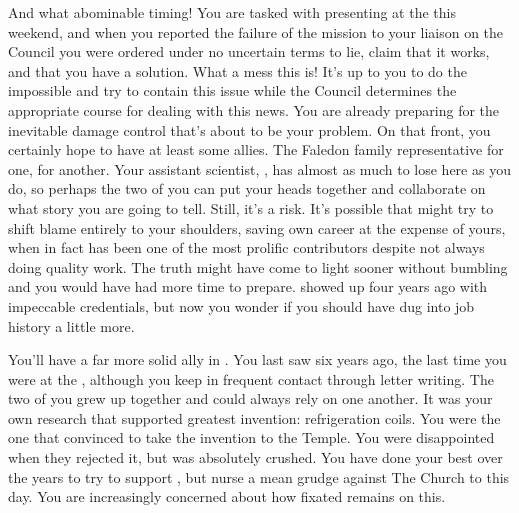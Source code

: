 \documentclass[char]{GL2020}
\begin{document}
And what abominable timing!  You are tasked with presenting at the \pSchool{} this weekend, and when you reported the failure of the mission to your liaison on the Council you were ordered under no uncertain terms to lie, claim that it works, and that you have a solution. What a mess this is!  It's up to you to do the impossible and try to contain this issue while the Council determines the appropriate course for dealing with this news. You are already preparing for the inevitable damage control that's about to be your problem. On that front, you certainly hope to have at least some allies. The Faledon family representative \cDiplomat{\full} for one, \cAssistantScientist{\full} for another. Your assistant scientist, \cAssistantScientist{}, has almost as much to lose here as you do, so perhaps the two of you can put your heads together and collaborate on what story you are going to tell. Still, it's a risk. It's possible that \cAssistantScientist{\they} might try to shift blame entirely to your shoulders, saving \cAssistantScientist{\their} own career at the expense of yours, when in fact \cAssistantScientist{} has been one of the most prolific contributors despite not always doing quality work. The truth might have come to light sooner without \cAssistantScientist{\their} bumbling and you would have had more time to prepare. \cAssistantScientist{} showed up four years ago with impeccable credentials, but now you wonder if you should have dug into \cAssistantScientist{\their} job history a little more.

You'll have a far more solid ally in \cChupInventor{}. You last saw \cChupInventor{\them} six years ago, the last time you were at the \pSc{}, although you keep in frequent contact through letter writing. The two of you grew up together and could always rely on one another. It was your own research that supported \cChupInventor{\their} greatest invention: refrigeration coils. You were the one that convinced \cChupInventor{} to take the invention to the Temple. You were disappointed when they rejected it, but \cChupInventor{} was absolutely crushed. You have done your best over the years to try to support \cChupInventor{}, but \cChupInventor{\they} nurse\cChupInventor{\plural} a mean grudge against The Church to this day. You are increasingly concerned about how fixated \cChupInventor{} remains on this.
\end{document}
